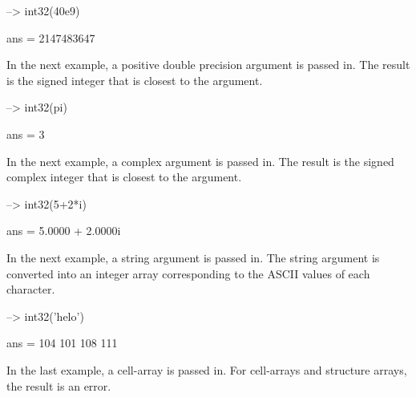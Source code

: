 \begin{DoxyVerbInclude}
--> int32(40e9)

ans = 
 2147483647 
\end{DoxyVerbInclude}


In the next example, a positive double precision argument is passed in. The result is the signed integer that is closest to the argument.


\begin{DoxyVerbInclude}
--> int32(pi)

ans = 
 3 
\end{DoxyVerbInclude}


In the next example, a complex argument is passed in. The result is the signed complex integer that is closest to the argument.


\begin{DoxyVerbInclude}
--> int32(5+2*i)

ans = 
   5.0000 +  2.0000i 
\end{DoxyVerbInclude}


In the next example, a string argument is passed in. The string argument is converted into an integer array corresponding to the A\-S\-C\-I\-I values of each character.


\begin{DoxyVerbInclude}
--> int32('helo')

ans = 
 104 101 108 111 
\end{DoxyVerbInclude}


In the last example, a cell-\/array is passed in. For cell-\/arrays and structure arrays, the result is an error.


